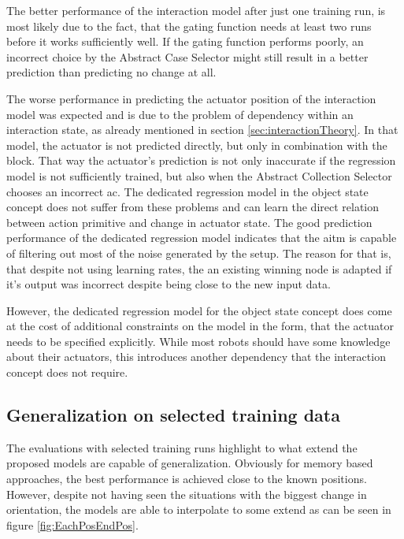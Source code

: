 The better performance of the interaction model after just one training run, is most likely due to the fact, that the gating function needs at least two runs before it works sufficiently well. If the gating function performs poorly, an incorrect choice by the Abstract Case Selector might still result in a better prediction than predicting no change at all.

The worse performance in predicting the actuator position of the interaction model was expected and is due to the problem of dependency within an interaction state, as already mentioned in section \ref{sec:interactionTheory}. In that model, the actuator is not predicted directly, but only in combination with the block. That way the actuator's prediction is not only inaccurate if the regression model is not sufficiently trained, but also when the Abstract Collection Selector chooses an incorrect \gls{ac}. The dedicated regression model in the object state concept does not suffer from these problems and can learn the direct relation between action primitive and change in actuator state. The good prediction performance of the dedicated regression model indicates that the \gls{aitm} is capable of filtering out most of the noise generated by the setup. The reason for that is, that despite not using learning rates, the an existing winning node is adapted if it's output was incorrect despite being close to the new input data. 

However, the dedicated regression model for the object state concept does come at the cost of additional constraints on the model in the form, that the actuator needs to be specified explicitly. While most robots should have some knowledge about their actuators, this introduces another dependency that the interaction concept does not require.

\subsection{Generalization on selected training data}

The evaluations with selected training runs highlight to what extend the proposed models are capable of generalization. Obviously for memory based approaches, the best performance is achieved close to the known positions. However, despite not having seen the situations with the biggest change in orientation, the models are able to interpolate to some extend as can be seen in figure \ref{fig:EachPosEndPos}.

